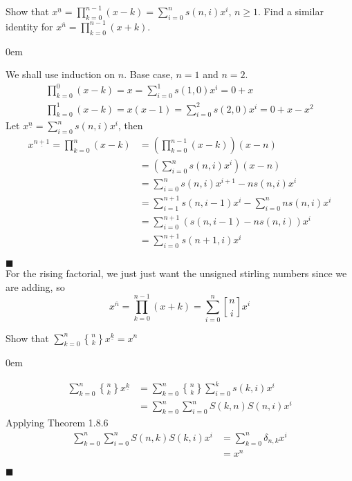 \documentclass[12pt]{article}
\author{Warren Atkison}
\date{\today}
\renewcommand{\qed}{\hfill$\blacksquare$}
\renewenvironment{proof}{\vspace{1em}\begin{addmargin}[2em]{0em}\begin{newproof}}{\end{newproof}\end{addmargin}\qed}
\newenvironment{exercise}[2][Exercise]{\begin{trivlist}
\item[\hskip \labelsep {\bfseries #1} \hskip \labelsep {\bfseries #2.}]}{\end{trivlist}}
\DeclareRobustCommand{\stirling}{\genfrac[]{0pt}{}}
\DeclareRobustCommand{\Stirling}{\genfrac\{\}{0pt}{}}
\begin{document}
\fancyhf{}
\fancyhead[R]{\today}
\fancyfoot[R]{\thepage}

\begin{exercise}{1.8.5 (2pt)}
	Show that $x^{\underline{n}} = \prod_{k=0}^{n-1} (x - k) = \sum_{i = 0}^n s(n,i)x^i$, $n \ge 1$. Find a similar identity for $x^{\overline{n}} = \prod_{k=0}^{n-1} (x +k)$.
\end{exercise}
\begin{proof} We shall use induction on $n$. Base case, $n = 1$ and $n = 2$.
	\begin{align*}
		\prod_{k=0}^{0}(x - k) = x = \sum_{i=0}^1 s(1,0)x^i = 0 + x \\
		\prod_{k=0}^{1}(x - k) = x(x - 1) = \sum_{i=0}^2 s(2,0)x^i = 0 + x - x^2
	\end{align*}
	Let $x^{\underline{n}} = \sum_{i = 0}^n s(n,i)x^i$, then
	\begin{align*}
		x^{\underline{n+1}} = \prod_{k=0}^n (x - k) &= \left(\prod_{k=0}^{n-1} (x-k)\right)(x - n) \\
							    &= \left(\sum_{i=0}^n s(n,i)x^i\right)(x - n) \\
							    &= \sum_{i=0}^n s(n,i)x^{i+1} - ns(n,i)x^i \\
							    &= \sum_{i=1}^{n+1} s(n,i-1)x^i - \sum_{i=0}^n ns(n,i)x^i \\
							    &= \sum_{i=0}^{n+1} (s(n,i-1) - ns(n,i))x^i \\
							    &= \sum_{i=0}^{n+1}s(n+1,i)x^i
	\end{align*}
\end{proof} \\
For the rising factorial, we just just want the unsigned stirling numbers since we are adding, so
\[
	x^{\overline{n}} = \prod_{k=0}^{n-1} (x+k) = \sum_{i = 0}^n \stirling{n}{i}x^i
\]
\begin{exercise}{1.8.6 (2pt)}
	Show that $\sum_{k=0}^n \Stirling{n}{k} x^{\underline{k}} = x^n$
\end{exercise}
\begin{proof}
	\begin{align*}
		\sum_{k=0}^n \Stirling{n}{k} x^{\underline{k}} &= \sum_{k = 0}^n \Stirling{n}{k} \sum_{i=0}^k s(k,i)x^i \\
							       &= \sum_{k=0}^n \sum_{i=0}^n S(k,n)S(n,i)x^i
	\end{align*}
	Applying Theorem 1.8.6
	\begin{align*}
		\sum_{k=0}^n \sum_{i=0}^n S(n,k)S(k,i)x^i &= \sum_{k=0}^n \delta_{n,k}x^i \\
							  &= x^n
	\end{align*}
\end{proof}
\end{document}
